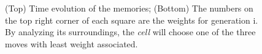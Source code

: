\documentclass[a4paper,prd,twocolumn,nofootinbib,superscriptaddress,floatfix]{revtex4}
\begin{document}
\begin{figure}[H] 
\centering

    \label{fig:3a} 
    \vspace{4ex}

  
    \label{fig:3b} 
    \vspace{4ex}
 
  \caption{(Top) Time evolution of the memories; (Bottom) The numbers on the top right corner of each square are the weights for generation i. By analyzing its surroundings, the \textit{cell} will choose one of the three moves with least weight associated.}
  \label{fig:3} 
\end{figure}
\end{document}
